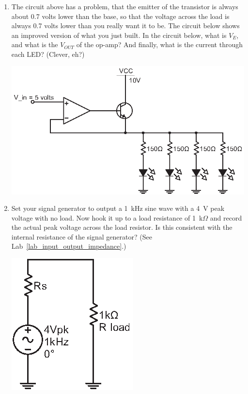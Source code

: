 \begin{enumerate}[wide]
\item The circuit above has a problem, that the emitter of the transistor is always about 0.7 volts lower than the base, so that the voltage across the load is always 0.7 volts lower than you really want it to be.  The circuit below shows an improved version of what you just built.  In the circuit below, what is $V_E$, and what is the $V_{OUT}$ of the op-amp?  And finally, what is the current through each LED?  (Clever, eh?)  \label{part_buffer_op-amp_emitter_follower}
\begin{center}
\includegraphics{bjt/emitter_follower2.eps}
\end{center}

\item Set your signal generator to output a 1~kHz sine wave with a 4~V peak voltage with no load.  Now hook it up to a load resistance of 1~k$\Omega$ and record the actual peak voltage across the load resistor.  Is this consistent with the internal resistance of the signal generator?  (See Lab~\ref{lab_input_output_impedance}.)
 \begin{center}
\includegraphics{bjt/unamplified_ac.eps}
\end{center}


\end{enumerate}
